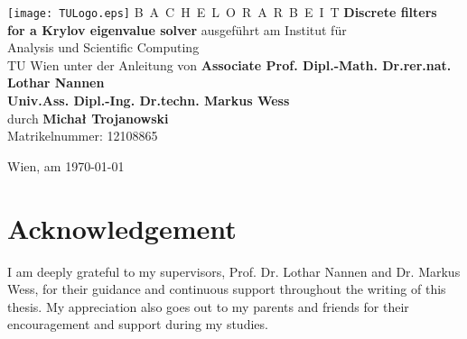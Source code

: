 \documentclass[a4paper,11pt,bibliography=totoc,listof=totoc,headinclude=true,cleardoublepage=empty,oneside]{scrbook}
\begin{document}


\begin{titlepage}
  \begin{center}
    \texttt{[image: TULogo.eps]}
    \vskip 1cm%
    {\LARGE B~\Large A~C~H~E~L~O~R~A~R~B~E~I~T}
    \vskip 8mm
    {\huge\bfseries Discrete filters  \\[1ex] for a Krylov eigenvalue solver}
    \vskip 1cm
    \large 
    ausgef\"uhrt am    
    \vskip 0.75cm
    {\Large Institut f\"ur\\[1ex] Analysis und Scientific Computing}\\[1ex]
    {\Large TU Wien}
    \vskip0.75cm
    unter der Anleitung von
    \vskip0.75cm
    {\Large\bfseries 
Associate Prof. Dipl.-Math. Dr.rer.nat. Lothar Nannen \\ 
Univ.Ass. Dipl.-Ing. Dr.techn. Markus Wess}\\[1ex]
    \vskip 0.5cm
    durch
    \vskip 0.5cm
    {\Large\bfseries Michał Trojanowski}\\[1ex]
    Matrikelnummer: 12108865\\[1ex]
  \end{center}
  
  \vfill
  
  \small
  Wien, am \today
  \vspace*{-15mm}
\end{titlepage}

\cleardoublepage


\chapter*{Acknowledgement}
\thispagestyle{empty}

{

I am deeply grateful to my supervisors, Prof. Dr. Lothar Nannen and Dr. Markus Wess, for their guidance and continuous support throughout the writing of this thesis. My appreciation also goes out to my parents and friends for their encouragement and support during my studies.
}
\end{document}
